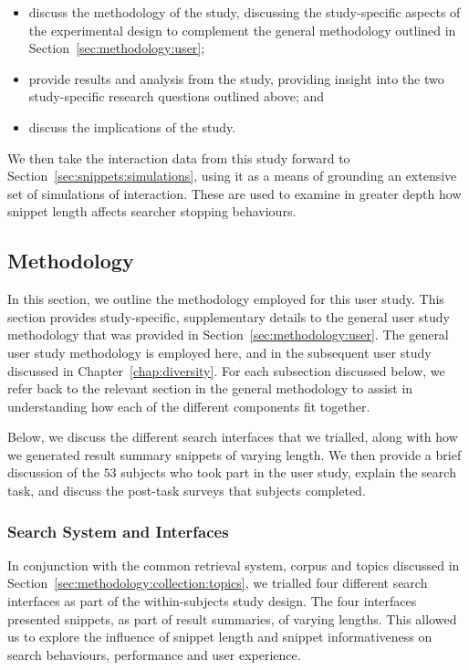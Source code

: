 \begin{itemize}
    \item{discuss the methodology of the study, discussing the study-specific aspects of the experimental design to complement the general methodology outlined in Section~\ref{sec:methodology:user};}
    \item{provide results and analysis from the study, providing insight into the two study-specific research questions outlined above; and}
    \item{discuss the implications of the study.}
\end{itemize}

We then take the interaction data from this study forward to Section~\ref{sec:snippets:simulations}, using it as a means of grounding an extensive set of simulations of interaction. These are used to examine in greater depth how snippet length affects searcher stopping behaviours.

\subsection{Methodology}\label{sec:snippets:method}
In this section, we outline the methodology employed for this user study. This section provides study-specific, supplementary details to the general user study methodology that was provided in Section~\ref{sec:methodology:user}. The general user study methodology is employed here, and in the subsequent user study discussed in Chapter~\ref{chap:diversity}. For each subsection discussed below, we refer back to the relevant section in the general methodology to assist in understanding how each of the different components fit together.

Below, we discuss the different search interfaces that we trialled, along with how we generated result summary snippets of varying length. We then provide a brief discussion of the $53$ subjects who took part in the user study, explain the search task, and discuss the post-task surveys that subjects completed.

\subsubsection{Search System and Interfaces}\label{sec:snippets:method:system}
In conjunction with the common retrieval system, corpus and topics discussed in Section~\ref{sec:methodology:collection:topics}, we trialled four different search interfaces as part of the within-subjects study design. The four interfaces presented snippets, as part of result summaries, of varying lengths. This allowed us to explore the influence of snippet length and snippet informativeness on search behaviours, performance and user experience.

